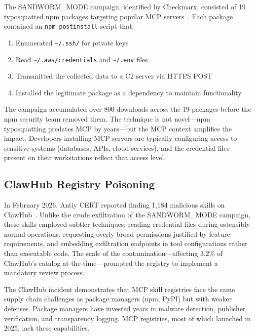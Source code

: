 \documentclass[11pt,twocolumn]{article}
\begin{document}
The SANDWORM\_MODE campaign, identified by Checkmarx, consisted of 19 typosquatted npm packages targeting popular MCP servers~\cite{sandworm}. Each package contained an \texttt{npm postinstall} script that:

\begin{enumerate}[leftmargin=*]
    \item Enumerated \texttt{\textasciitilde/.ssh/} for private keys
    \item Read \texttt{\textasciitilde/.aws/credentials} and \texttt{\textasciitilde/.env} files
    \item Transmitted the collected data to a C2 server via HTTPS POST
    \item Installed the legitimate package as a dependency to maintain functionality
\end{enumerate}

The campaign accumulated over 800 downloads across the 19 packages before the npm security team removed them. The technique is not novel---npm typosquatting predates MCP by years---but the MCP context amplifies the impact. Developers installing MCP servers are typically configuring access to sensitive systems (databases, APIs, cloud services), and the credential files present on their workstations reflect that access level.

\subsection{ClawHub Registry Poisoning}

In February 2026, Antiy CERT reported finding 1,184 malicious skills on ClawHub~\cite{antiy-cert}. Unlike the crude exfiltration of the SANDWORM\_MODE campaign, these skills employed subtler techniques: reading credential files during ostensibly normal operations, requesting overly broad permissions justified by feature requirements, and embedding exfiltration endpoints in tool configurations rather than executable code. The scale of the contamination---affecting 3.2\% of ClawHub's catalog at the time---prompted the registry to implement a mandatory review process.

The ClawHub incident demonstrates that MCP skill registries face the same supply chain challenges as package managers (npm, PyPI) but with weaker defenses. Package managers have invested years in malware detection, publisher verification, and transparency logging. MCP registries, most of which launched in 2025, lack these capabilities.
\end{document}
